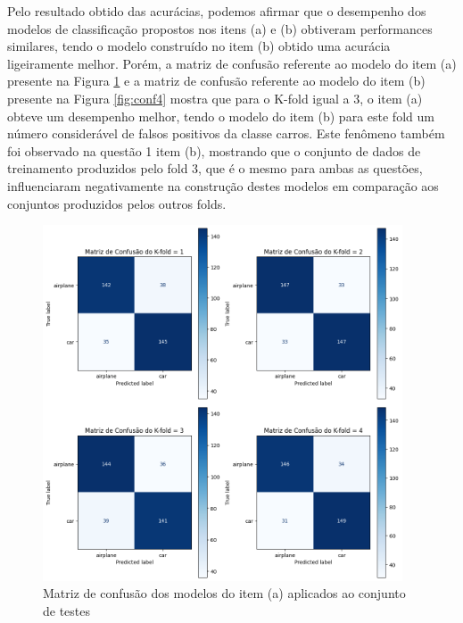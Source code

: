 \documentclass[]{abntex2}
\begin{document}
Pelo resultado obtido das acurácias, podemos afirmar que o desempenho dos modelos de classificação propostos nos itens (a) e (b) obtiveram performances similares, tendo o modelo construído no item (b) obtido uma acurácia ligeiramente melhor. Porém, a matriz de confusão referente ao modelo do item (a) presente na Figura \ref{fig:conf3} e a matriz de confusão referente ao modelo do item (b) presente na Figura \ref{fig:conf4} mostra que para o K-fold igual a 3, o item (a) obteve um desempenho melhor, tendo o modelo do item (b) para este fold um número considerável de falsos positivos da classe carros. Este fenômeno também foi observado na questão 1 item (b), mostrando que o conjunto de dados de treinamento produzidos pelo fold 3, que é o mesmo para ambas as questões, influenciaram negativamente na construção destes modelos em comparação aos conjuntos produzidos pelos outros folds.

\begin{figure}[H]
    \centering 
    \includegraphics[width=0.95\textwidth]{imgs/ex3/conf3.png}
    \caption{Matriz de confusão dos modelos do item (a) aplicados ao conjunto de testes}
    \label{fig:conf3} %
\end{figure}
\end{document}
